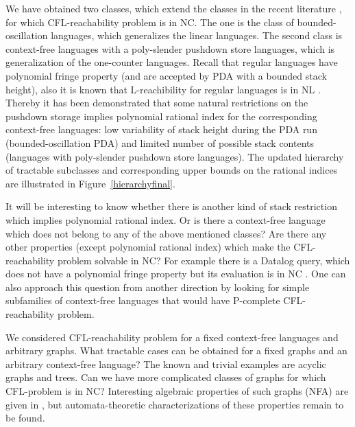 \documentclass[smallextended]{svjour3}       %
\begin{document}
We have obtained two classes, which extend the classes in the recent literature \cite*{ChainQ, LabelledGraphs, LReach, Regularrealizability, Ullman}, for which CFL-reachability problem is in NC. The one is the class of bounded-oscillation languages, which generalizes the linear languages. The second class is context-free languages with a poly-slender pushdown store languages, which is generalization of the one-counter languages. Recall that regular languages have polynomial fringe property (and are accepted by PDA with a bounded stack height), also it is known that L-reachibility for regular languages is in NL \cite*{LReach, Yannakakis}. Thereby it has been demonstrated that some natural restrictions on the pushdown storage implies polynomial rational index for the corresponding context-free languages: low variability of stack height during the PDA run (bounded-oscillation PDA) and limited number of possible stack contents (languages with poly-slender pushdown store languages). The updated hierarchy of tractable subclasses and corresponding upper bounds on the rational indices are illustrated in Figure~\ref{hierarchyfinal}.


It will be interesting to know whether there is another kind of stack restriction which implies polynomial rational index. Or is there a context-free language which does not belong to any of the above mentioned classes? Are there any other properties (except polynomial rational index) which make the CFL-reachability problem solvable in NC? For example there is a Datalog query, which does not have a polynomial fringe property but its evaluation is in NC \cite{Kanellakis}. One can also approach this question from another direction by looking for simple subfamilies of context-free languages that would have P-complete CFL-reachability problem.


We considered CFL-reachability problem for a fixed context-free languages and arbitrary graphs. What tractable cases can be obtained for a fixed graphs and an arbitrary context-free language? The known and trivial examples are acyclic graphs and trees. Can we have more complicated classes of graphs for which CFL-problem is in NC? Interesting algebraic properties of such graphs (NFA) are given in \cite{ganardi2016circuit}, but automata-theoretic characterizations of these properties remain to be found.

\end{document}
